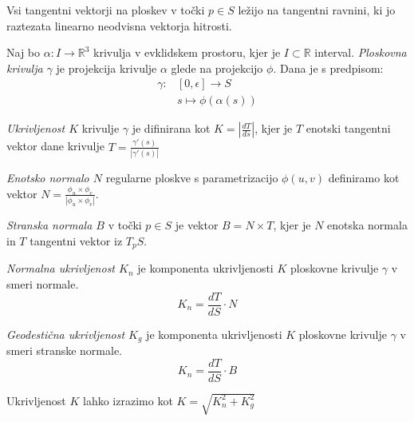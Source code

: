 \documentclass[mat1]{fmfdelo}
\newcommand{\R}{\mathbb R}
\begin{document}
Vsi tangentni vektorji na ploskev v točki $p \in S$ ležijo na tangentni ravnini, ki jo raztezata linearno neodvisna vektorja hitrosti.

\begin{definicija}
    Naj bo $\alpha : I \to \R^3$ krivulja v evklidskem prostoru, kjer je $I \subset \R$ interval.
    \emph{Ploskovna krivulja $\gamma$} je projekcija krivulje $\alpha$ glede na projekcijo $\phi$. Dana je s predpisom:
    \begin{align*}
        \gamma : & \left[ 0, \epsilon \right] \to S \\
        & s \mapsto \phi(\alpha(s))
    \end{align*}
\end{definicija}

\begin{definicija}
    \emph{Ukrivljenost $K$} krivulje $\gamma$ je difinirana kot $K = \left\lvert \frac{dT}{ds} \right\rvert $, kjer je $T$ enotski tangentni vektor dane krivulje $T = \frac{\gamma'(s)}{\left\lvert \gamma'(s) \right\rvert }$
\end{definicija}

\begin{definicija}
    \emph{Enotsko normalo $N$} regularne ploskve s parametrizacijo $\phi(u, v)$ definiramo kot vektor $N = \frac{\phi_u \times \phi_v}{\left\lvert \phi_u \times \phi_v \right\rvert }$.
\end{definicija}

\begin{definicija}
    \emph{Stranska normala $B$} v točki $p \in S$ je vektor $B = N \times T$, kjer je $N$ enotska normala in $T$ tangentni vektor iz $T_p S$.
\end{definicija}

\begin{definicija}
    \emph{Normalna ukrivljenost $K_n$} je komponenta ukrivljenosti $K$ ploskovne krivulje $\gamma$ v smeri normale.
    $$ K_n = \frac{dT}{dS} \cdot N $$
\end{definicija}

\begin{definicija}
    \emph{Geodestična ukrivljenost $K_g$} je komponenta ukrivljenosti $K$ ploskovne krivulje $\gamma$ v smeri stranske normale.
    $$ K_n = \frac{dT}{dS} \cdot B $$
\end{definicija}

\begin{lema}
    Ukrivljenost $K$ lahko izrazimo kot $K = \sqrt{K_n^2 + K_g^2}$
\end{lema}
\end{document}
